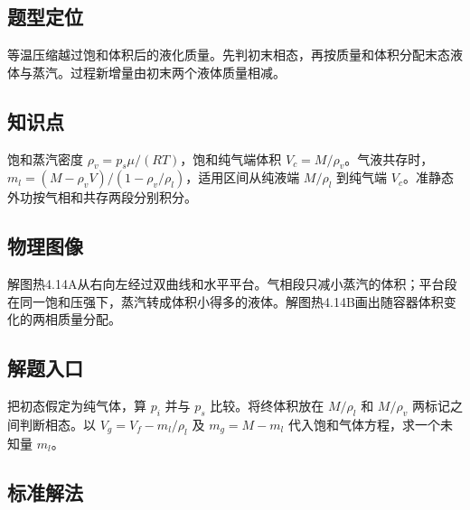 \documentclass[UTF8,fontset=fandol,a4paper,11pt]{ctexart}
\begin{document}
\subsection*{题型定位}

等温压缩越过饱和体积后的液化质量。先判初末相态，再按质量和体积分配末态液体与蒸汽。过程新增量由初末两个液体质量相减。



\subsection*{知识点}

饱和蒸汽密度 $\rho_v=p_s\mu/(RT)$，饱和纯气端体积 $V_c=M/\rho_v$。气液共存时，$m_l=(M-\rho_v V)/(1-\rho_v/\rho_l)$，适用区间从纯液端 $M/\rho_l$ 到纯气端 $V_c$。准静态外功按气相和共存两段分别积分。




\subsection*{物理图像}

解图热4.14A从右向左经过双曲线和水平平台。气相段只减小蒸汽的体积；平台段在同一饱和压强下，蒸汽转成体积小得多的液体。解图热4.14B画出随容器体积变化的两相质量分配。



\subsection*{解题入口}

把初态假定为纯气体，算 $p_i$ 并与 $p_s$ 比较。将终体积放在 $M/\rho_l$ 和 $M/\rho_v$ 两标记之间判断相态。以 $V_g=V_f-m_l/\rho_l$ 及 $m_g=M-m_l$ 代入饱和气体方程，求一个未知量 $m_l$。




\subsection*{标准解法}
\end{document}
